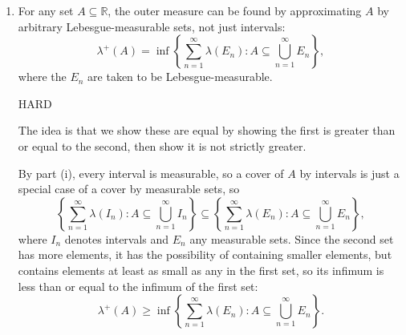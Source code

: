 \documentclass{article}
\begin{document}
\begin{enumerate}
\begin{enumerate}
			\item For any set $A\subseteq \mathbb{R}$, the outer measure can be found by approximating $A$ by arbitrary Lebesgue-measurable sets, not just intervals:
				\[\lambda^+(A)=\inf\left\{\sum_{n=1}^\infty \lambda(E_n):A\subseteq \bigcup_{n=1}^\infty E_n\right\},\]
				where the $E_n$ are taken to be Lebesgue-measurable.
				
						{{\color{red} HARD}
						
						\color{blue}
							The idea is that we show these are equal by showing the first is greater than or equal to the second, then show it is not strictly greater.
							
							By part (i), every interval is measurable, so a cover of $A$ by intervals is just a special case of a cover by measurable sets, so
							\[\left\{\sum_{n=1}^\infty \lambda(I_n):A\subseteq \bigcup_{n=1}^\infty I_n\right\}\subseteq \left\{\sum_{n=1}^\infty \lambda(E_n):A\subseteq \bigcup_{n=1}^\infty E_n\right\},\]
							where $I_n$ denotes intervals and $E_n$ any measurable sets. Since the second set has more elements, it has the possibility of containing smaller elements, but contains elements at least as small as any in the first set, so its infimum is less than or equal to the infimum of the first set:
							\[\lambda^+(A)\geq \inf\left\{\sum_{n=1}^\infty \lambda(E_n):A\subseteq \bigcup_{n=1}^\infty E_n\right\}.\]

}
\end{enumerate}
\end{enumerate}
\end{document}
